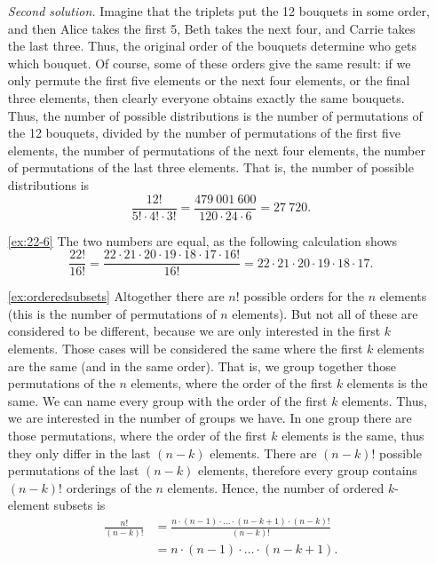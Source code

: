\begin{enumerate}
\emph{Second solution.}
Imagine that the triplets put the 12 bouquets in some order, 
and then Alice takes the first 5, 
Beth takes the next four, 
and Carrie takes the last three. 
Thus, the original order of the bouquets determine who gets which bouquet. 
Of course, 
some of these orders give the same result: 
if we only permute the first five elements or the next four elements, 
or the final three elements, 
then clearly everyone obtains exactly the same bouquets. 
Thus, the number of possible distributions is the number of permutations of the 12 bouquets, 
divided by the number of permutations of the first five elements, 
the number of permutations of the next four elements, 
the number of permutations of the last three elements. 
That is, 
the number of possible distributions is 
\[
\frac{12!}{5! \cdot 4! \cdot 3!} = \frac{479~001~600}{120 \cdot 24 \cdot 6} = 27~720. 
\]


\item[\ref{ex:22-6}]
The two numbers are equal, as the following calculation shows
\[
\frac{22!}{16!} = \frac{22 \cdot 21 \cdot 20 \cdot 19 \cdot 18 \cdot 17 \cdot 16!}{16!} 
= 22 \cdot 21 \cdot 20 \cdot 19 \cdot 18 \cdot 17. 
\]

\item[\ref{ex:orderedsubsets}]
Altogether there are $n!$ possible orders for the $n$ elements (this is the number of permutations of $n$ elements). 
But not all of these are considered to be different, because we are only interested in the first $k$ elements. 
Those cases will be considered the same where the first $k$ elements are the same (and in the same order). 
That is, we group together those permutations of the $n$ elements, 
where the order of the first $k$ elements is the same. 
We can name every group with the order of the first $k$ elements. 
Thus, we are interested in the number of groups we have. 
In one group there are those permutations, 
where the order of the first $k$ elements is the same, 
thus they only differ in the last $(n-k)$ elements. 
There are $(n-k)!$ possible permutations of the last $(n-k)$ elements, 
therefore every group contains $(n-k)!$ orderings of the $n$ elements. 
Hence, 
the number of ordered $k$-element subsets is
\begin{align*}
\frac{n!}{(n-k)!} &= \frac{n \cdot (n-1) \cdot \dots \cdot (n-k+1) \cdot (n-k)!}{(n-k)!} \\
&= n \cdot (n-1) \cdot \dots \cdot (n-k+1).
\end{align*}


\end{enumerate}
